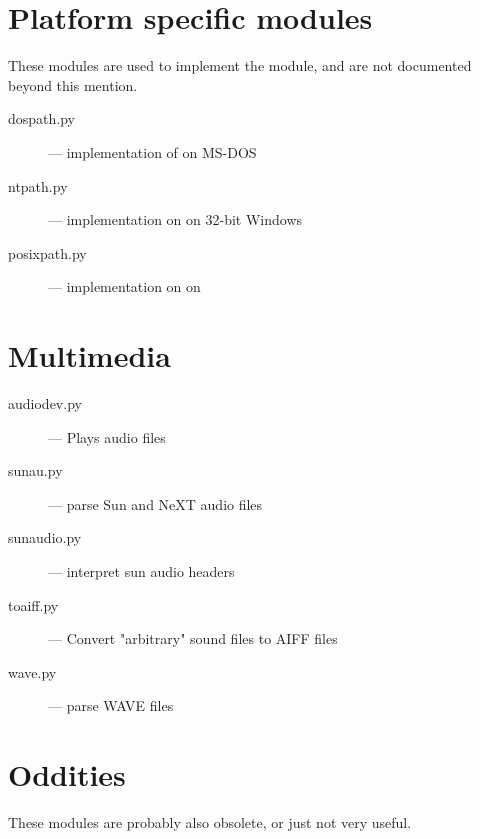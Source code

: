 \section{Platform specific modules}


These modules are used to implement the  module, and
are not documented beyond this mention.

\begin{description}
\item[dospath.py]
--- implementation of  on MS-DOS

\item[ntpath.py]
--- implementation on  on 32-bit Windows

\item[posixpath.py]
--- implementation on  on \POSIX{}
\end{description}


\section{Multimedia}

\begin{description}
\item[audiodev.py]
--- Plays audio files

\item[sunau.py]
--- parse Sun and NeXT audio files

\item[sunaudio.py]
--- interpret sun audio headers

\item[toaiff.py]
--- Convert "arbitrary" sound files to AIFF files

\item[wave.py]
--- parse WAVE files
\end{description}


\section{Oddities}

These modules are probably also obsolete, or just not very useful.

